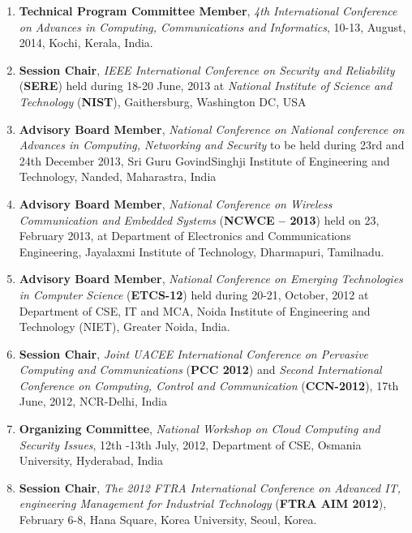 \begin{enumerate} [label=(\arabic*).]
\item
\textbf{Technical Program Committee Member}, \textit{4th International Conference on Advances in Computing, Communications and Informatics}, 10-13, August, 2014, Kochi, Kerala, India.

\item
\textbf{Session Chair}, \textit{IEEE International Conference on Security and Reliability} (\textbf{SERE}) held during 18-20 June, 2013 at\textit{ National Institute of Science and Technology} (\textbf{NIST}), Gaithersburg, Washington DC, USA

\item
\textbf{Advisory Board Member}, \textit{National Conference on National conference on Advances in Computing, Networking and Security} to be held during 23rd and 24th December 2013, Sri Guru GovindSinghji Institute of Engineering and Technology, Nanded, Maharastra, India

\item
\textbf{Advisory Board Member}, \textit{National Conference on Wireless Communication and Embedded Systems} (\textbf{NCWCE – 2013}) held on 23, February 2013, at Department of Electronics and Communications Engineering, Jayalaxmi Institute of Technology, Dharmapuri, Tamilnadu. 

\item
\textbf{Advisory Board Member}, \textit{National Conference on Emerging Technologies in Computer Science}  (\textbf{ETCS-12})  held during 20-21, October, 2012 at Department of CSE, IT and MCA, Noida Institute of Engineering and Technology (NIET), Greater Noida, India.

\item
\textbf{Session Chair},\textit{ Joint UACEE International Conference on Pervasive Computing and Communications} (\textbf{PCC 2012}) and \textit{Second International Conference on Computing, Control and Communication }(\textbf{CCN-2012}), 17th June, 2012, NCR-Delhi, India

\item
\textbf{Organizing Committee}, \textit{National Workshop on Cloud Computing and Security Issues}, 12th -13th July, 2012, Department of CSE, Osmania University, Hyderabad, India

\item
\textbf{Session Chair}, \textit{The 2012 FTRA International Conference on Advanced IT, engineering Management for Industrial Technology} (\textbf{FTRA AIM 2012}), February 6-8, Hana Square, Korea University, Seoul, Korea.


\end{enumerate}
